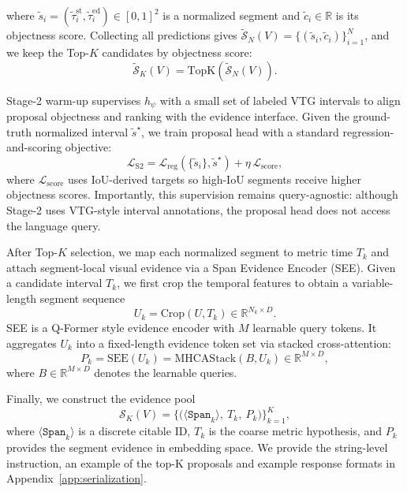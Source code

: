 \documentclass{article}
\theoremstyle{plain}
\theoremstyle{definition}
\theoremstyle{remark}
\begin{document}
where $\tilde{s}_i=(\tilde{\tau}^{\mathrm{st}}_i,\tilde{\tau}^{\mathrm{ed}}_i)\in[0,1]^2$ is a normalized segment and $\tilde{c}_i\in\mathbb{R}$ is its objectness score.
Collecting all predictions gives $\tilde{\mathcal{S}}_{N}(V)=\{(\tilde{s}_i,\tilde{c}_i)\}_{i=1}^{N}$, and we keep the Top-$K$ candidates by objectness score:
\begin{equation}
\tilde{\mathcal{S}}_{K}(V)=\mathrm{TopK}\!\left(\tilde{\mathcal{S}}_{N}(V)\right).
\label{eq:topk_pool}
\end{equation}

Stage-2 warm-up supervises $h_{\psi}$ with a small set of labeled VTG intervals to align proposal objectness and ranking with the evidence interface.
Given the ground-truth normalized interval $\tilde{s}^\star$,
we train proposal head with a standard regression-and-scoring objective:
\begin{equation}
\mathcal{L}_{\mathrm{S2}}
=
\mathcal{L}_{\mathrm{reg}}\!\left(\{\tilde{s}_i\},\tilde{s}^{\star}\right)
+
\eta\,\mathcal{L}_{\mathrm{score}},
\label{eq:s2_loss}
\end{equation}
where $\mathcal{L}_{\mathrm{score}}$ uses IoU-derived targets so high-IoU segments receive higher objectness scores.
Importantly, this supervision remains query-agnostic: although Stage-2 uses VTG-style interval annotations, the proposal head does not access the language query.

After Top-$K$ selection, we map each normalized segment to metric time $T_k$ and attach segment-local visual evidence via a Span Evidence Encoder (SEE).
Given a candidate interval $T_k$, we first crop the temporal features to obtain a variable-length segment sequence
\begin{equation}
U_k=\mathrm{Crop}(U,T_k)\in\mathbb{R}^{N_k\times D}.
\label{eq:crop_uk}
\end{equation}
SEE is a Q-Former style evidence encoder with $M$ learnable query tokens. It aggregates $U_k$ into a fixed-length evidence token set via stacked cross-attention:
\begin{equation}
P_k=\mathrm{SEE}(U_k)=\mathrm{MHCAStack}(B,U_k)\in\mathbb{R}^{M\times D},
\label{eq:see_tokens}
\end{equation}
where $B\in\mathbb{R}^{M\times D}$ denotes the learnable queries.

Finally, we construct the evidence pool
\begin{equation}
\mathcal{S}_K(V)
=
\Big\{
\big(\langle\texttt{Span}_k\rangle,\ T_k,\ P_k\big)
\Big\}_{k=1}^{K},
\label{eq:evidence_pool}
\end{equation}
where $\langle\texttt{Span}_k\rangle$ is a discrete citable ID, $T_k$ is the coarse metric hypothesis, and $P_k$ provides the segment evidence in embedding space. We provide the string-level instruction, an example of the top-K proposals and example response formats in Appendix~\ref{app:serialization}.
\end{document}

